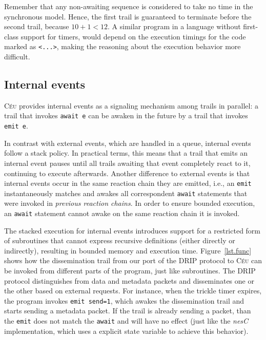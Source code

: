 \documentclass[10pt]{sensys-proc}
\newcommand{\CEU}{\textsc{C\'{e}u}\xspace}
\newcommand{\code}[1] {{\small{\texttt{#1}}}}
\begin{document}
Remember that any non-awaiting sequence is considered to take no time in the 
synchronous model.
Hence, the first trail is guaranteed to terminate before the second trail, 
because $10+1 < 12$.
A similar program in a language without first-class support for timers, would 
depend on the execution timings for the code marked as \code{<...>}, making the 
reasoning about the execution behavior more difficult.


\subsection{Internal events}
\label{sec.ceu.ints}

\CEU provides internal events as a signaling mechanism among trails in 
parallel:
a trail that invokes \code{await~e} can be awaken in the future by a trail that 
invokes \code{emit~e}.

In contrast with external events, which are handled in a queue, internal events 
follow a stack policy.
In practical terms, this means that a trail that emits an internal event pauses 
until all trails awaiting that event completely react to it, continuing to 
execute afterwards.
%
Another difference to external events is that internal events occur in the same 
reaction chain they are emitted, i.e., an \code{emit} instantaneously matches 
and awakes all correspondent \code{await} statements that were invoked in 
\emph{previous reaction chains}.
In order to ensure bounded execution, an \code{await} statement cannot awake on 
the same reaction chain it is invoked.

The stacked execution for internal events introduces support for a restricted 
form of subroutines that cannot express recursive definitions (either directly 
or indirectly), resulting in bounded memory and execution time.
%
Figure~\ref{lst.func} shows how the dissemination trail from our port of the 
DRIP protocol to \CEU can be invoked from different parts of the program, just 
like subroutines.
The DRIP protocol distinguishes from data and metadata packets and disseminates 
one or the other based on external requests.
For instance, when the trickle timer expires, the program invokes 
\code{emit~send=1}, which awakes the dissemination trail and starts sending a 
metadata packet.
If the trail is already sending a packet, than the \code{emit} does not match 
the \code{await} and will have no effect (just like the \emph{nesC} 
implementation, which uses a explicit state variable to achieve this behavior).
\end{document}
